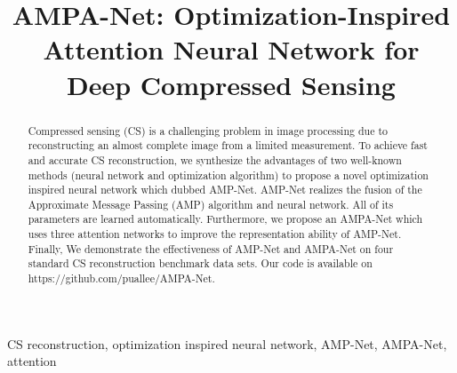 \documentclass[conference]{IEEEtran}
\begin{document}
\title{AMPA-Net: Optimization-Inspired Attention Neural Network for Deep Compressed Sensing\\
}
\author{
\and
{}
}
\maketitle

\begin{abstract}
Compressed sensing (CS) is a challenging problem in image processing due to reconstructing an almost complete image from a limited measurement. To achieve fast and accurate CS reconstruction, we synthesize the advantages of two well-known methods (neural network and optimization algorithm) to propose a novel optimization inspired neural network which dubbed AMP-Net. AMP-Net realizes the fusion of the Approximate Message Passing (AMP) algorithm and neural network. All of its parameters are learned automatically. Furthermore, we propose an AMPA-Net which uses three attention networks to improve the representation ability of AMP-Net. Finally, We demonstrate the effectiveness of AMP-Net and AMPA-Net on four standard CS reconstruction benchmark data sets. Our code is available on https://github.com/puallee/AMPA-Net.
\end{abstract}
\begin{IEEEkeywords}
CS reconstruction, optimization inspired neural network, AMP-Net, AMPA-Net, attention
\end{IEEEkeywords}
\IEEEpeerreviewmaketitle
\end{document}
